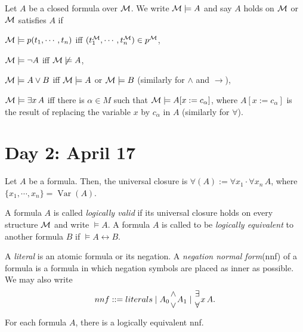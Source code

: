 \documentclass{../../small}
\DeclareMathOperator{\Var}{Var}
\begin{document}
\begin{defn}
Let $A$ be a closed formula over $\mathcal{M}$.
We write $\mathcal{M}\models A$ and say $A$ holds on $\mathcal{M}$ or $\mathcal{M}$ satisfies $A$ if
\begin{parts}
\item $\mathcal{M}\models p(t_1,\cdots,t_n)$ iff $(t_1^{\mathcal{M}},\cdots,t_n^{\mathcal{M}})\in p^{\mathcal{M}}$,
\item $\mathcal{M}\models\neg A$ iff $\mathcal{M}\not\models A$,
\item $\mathcal{M}\models A\vee B$ iff $\mathcal{M}\models A$ or $\mathcal{M}\models B$ (similarly for $\wedge$ and $\to$),
\item $\mathcal{M}\models\exists x\,A$ iff there is $\alpha\in M$ such that $\mathcal{M}\models A[x:=c_\alpha]$, where $A[x:=c_\alpha]$ is the result of replacing the variable $x$ by $c_\alpha$ in $A$ (similarly for $\forall$).
\end{parts}
\end{defn}



\iffalse
First order syntax

variables
	functions
terms
	a relation
literals
	connectives
formulas
	quantifiers
sentences
\fi



\section{Day 2: April 17}

Let $A$ be a formula.
Then, the universal closure is $\forall(A):=\forall x_1\cdot\forall x_n\,A$, where $\{x_1,\cdots,x_n\}=\Var(A)$.

\begin{defn*}
A formula $A$ is called \emph{logically valid} if its universal closure holds on every structure $\mathcal{M}$ and write $\models A$.
A formula $A$ is called to be \emph{logically equivalent} to another formula $B$ if $\models A\leftrightarrow B$.
\end{defn*}

\begin{defn*}
A \emph{literal} is an atomic formula or its negation.
A \emph{negation normal form}(nnf) of a formula is a formula in which negation symbols are placed as inner as possible.
We may also write
\[nnf::=literals\mid A_0{\wedge\atop\vee}A_1\mid{\exists\atop\forall}x\,A.\]
\end{defn*}

\begin{prop*}
For each formula $A$, there is a logically equivalent nnf.
\end{prop*}
\end{document}
